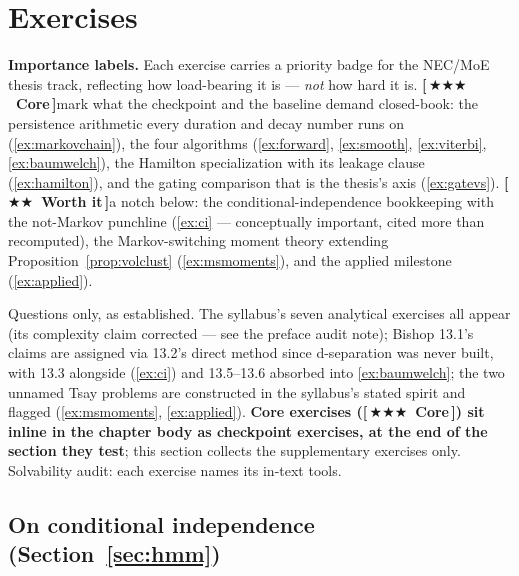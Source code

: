 \documentclass[11pt]{article}
\numberwithin{equation}{section}
\theoremstyle{plain}
\theoremstyle{definition}
\theoremstyle{remark}
\newcounter{exercise}
\newcommand{\prioCore}{{\normalfont\small\textbf{\textcolor{necblue}{[\,\ensuremath{\bigstar\bigstar\bigstar}\ Core\,]}}}\hspace{0.5em}}
\newcommand{\prioWorth}{{\normalfont\small\textbf{\textcolor{finmaroon}{[\,\ensuremath{\bigstar\bigstar}\ Worth it\,]}}}\hspace{0.5em}}
\begin{document}
\section{Exercises}\label{sec:exercises}

\noindent\textbf{Importance labels.} Each exercise carries a priority badge for the NEC/MoE thesis track, reflecting how load-bearing it is --- \emph{not} how hard it is. \prioCore mark what the checkpoint and the baseline demand closed-book: the persistence arithmetic every duration and decay number runs on (\ref{ex:markovchain}), the four algorithms (\ref{ex:forward}, \ref{ex:smooth}, \ref{ex:viterbi}, \ref{ex:baumwelch}), the Hamilton specialization with its leakage clause (\ref{ex:hamilton}), and the gating comparison that is the thesis's axis (\ref{ex:gatevs}). \prioWorth a notch below: the conditional-independence bookkeeping with the not-Markov punchline (\ref{ex:ci} --- conceptually important, cited more than recomputed), the Markov-switching moment theory extending Proposition~\ref{prop:volclust} (\ref{ex:msmoments}), and the applied milestone (\ref{ex:applied}).

Questions only, as established. The syllabus's seven analytical exercises all appear (its complexity claim corrected --- see the preface audit note); Bishop 13.1's claims are assigned via 13.2's direct method since d-separation was never built, with 13.3 alongside (\ref{ex:ci}) and 13.5--13.6 absorbed into \ref{ex:baumwelch}; the two unnamed Tsay problems are constructed in the syllabus's stated spirit and flagged (\ref{ex:msmoments}, \ref{ex:applied}). \textbf{Core exercises (\prioCore) sit inline in the chapter body as checkpoint exercises, at the end of the section they test}; this section collects the supplementary exercises only. Solvability audit: each exercise names its in-text tools.

\subsection*{On conditional independence (Section~\ref{sec:hmm})}
\end{document}
